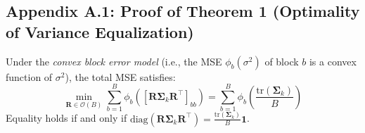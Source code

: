 \subsection*{Appendix A.1: Proof of Theorem 1 (Optimality of Variance Equalization)}
\label{app:proof_thm1}

\begin{theorem}
Under the \textit{convex block error model} (i.e., the MSE $\phi_b(\sigma^2)$ of block $b$ is a convex function of $\sigma^2$), the total MSE satisfies:
\begin{equation}
\min_{\mathbf{R} \in \mathcal{O}(B)} \sum_{b=1}^B \phi_b \left( [\mathbf{R} \boldsymbol{\Sigma}_k \mathbf{R}^\top]_{bb} \right) = \sum_{b=1}^B \phi_b \left( \frac{\mathrm{tr}(\boldsymbol{\Sigma}_k)}{B} \right)
\end{equation}
Equality holds if and only if $\mathrm{diag}(\mathbf{R} \boldsymbol{\Sigma}_k \mathbf{R}^{\top}) = \frac{\mathrm{tr}(\boldsymbol{\Sigma}_k)}{B} \mathbf{1}$.
\end{theorem}

